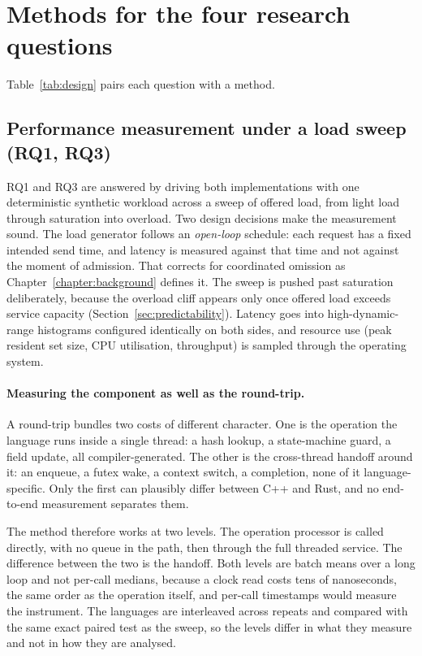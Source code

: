 \documentclass[english,oneside,a4paper,censored,csm,software-track-2020]{HYthesisML}
\begin{document}
\section{Methods for the four research questions}
Table~\ref{tab:design} pairs each question with a method.

\subsection{Performance measurement under a load sweep (RQ1, RQ3)}\label{sec:methodperf}
RQ1 and RQ3 are answered by driving both implementations with one deterministic synthetic
workload across a sweep of offered load, from light load through saturation into overload. Two
design decisions make the measurement sound. The load generator follows an \emph{open-loop}
schedule: each request has a fixed intended send time, and latency is measured against that time
and not against the moment of admission. That corrects for coordinated omission as
Chapter~\ref{chapter:background} defines it. The sweep is pushed past saturation deliberately,
because the overload cliff appears only once offered load exceeds service capacity
(Section~\ref{sec:predictability}). Latency goes into high-dynamic-range histograms configured
identically on both sides, and resource use (peak resident set size, CPU utilisation,
throughput) is sampled through the operating system.

\paragraph{Measuring the component as well as the round-trip.}
A round-trip bundles two costs of different character. One is the operation the language runs
inside a single thread: a hash lookup, a state-machine guard, a field update, all
compiler-generated. The other is the cross-thread handoff around it: an enqueue, a futex wake, a
context switch, a completion, none of it language-specific. Only the first can plausibly differ
between C++ and Rust, and no end-to-end measurement separates them.

The method therefore works at two levels. The operation processor is called directly, with no
queue in the path, then through the full threaded service. The difference between the two is the
handoff. Both levels are batch means over a long loop and not per-call medians, because a clock
read costs tens of nanoseconds, the same order as the operation itself, and per-call timestamps
would measure the instrument. The languages are interleaved across repeats and compared with the
same exact paired test as the sweep, so the levels differ in what they measure and not in how
they are analysed.
\end{document}
